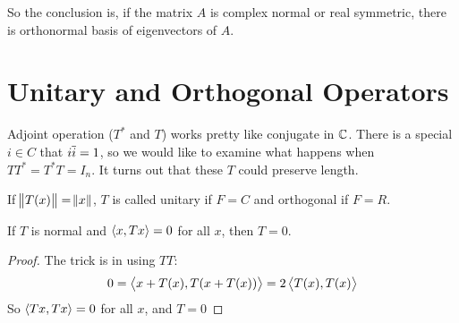 So the conclusion is, if the matrix $A$ is complex normal or real symmetric, there is orthonormal basis of eigenvectors of $A$.

\section{Unitary and Orthogonal Operators}

Adjoint operation ($T^*$ and $T$) works pretty like conjugate in $\mathbb{C}$. There is a special $i \in C$  that $i \overline{i} = 1$, so we would like to examine what happens when $TT^* = T^* T = I_n$. It turns out that these $T$ could preserve length.

\begin{definition}\label{unitary}
    If $\norm{T(x)} = \norm{x}$, $T$ is called unitary if $F=C$ and orthogonal if $F=R$.
\end{definition}




\begin{theorem}\label{normal_zero_operator}
    If $T$ is normal and $\left\langle \displaystyle x, Tx \right\rangle = 0$ for all $x$, then $T=0$.
\end{theorem}
\begin{proof}
    The trick is in using $TT$:
    \begin{equation*}
        0 = \left\langle \displaystyle x + T(x), T(x + T(x)) \right\rangle = 2 \left\langle \displaystyle T(x), T(x) \right\rangle
    \end{equation*}
    So $\left\langle \displaystyle Tx, Tx \right\rangle = 0$ for all $x$, and $T = 0$
\end{proof}


